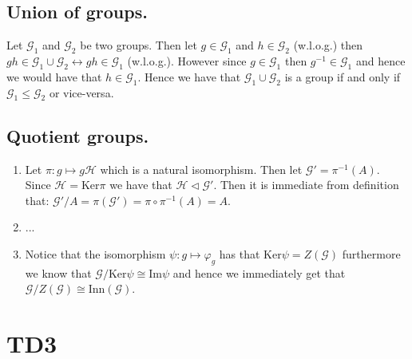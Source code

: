 \documentclass[10pt,a4paper]{book}
\begin{document}
\section{Union of groups.}
Let $\mathcal{G}_1$ and $\mathcal{G}_2$ be two groups. Then let $g \in \mathcal{G}_1$ and $h \in \mathcal{G}_2$ (w.l.o.g.) then $gh \in \mathcal{G}_1 \cup \mathcal{G}_2 \leftrightarrow gh \in \mathcal{G}_1$ (w.l.o.g.). However since $g \in \mathcal{G}_1$ then $g^{-1} \in \mathcal{G}_1$ and hence we would have that $h \in \mathcal{G}_1$. Hence we have that $\mathcal{G}_1 \cup \mathcal{G}_2$ is a group if and only if $\mathcal{G}_1 \leqslant \mathcal{G}_2$ or vice-versa.   

\section{Quotient groups.}
\begin{enumerate}
\item Let $\pi : g \mapsto g \mathcal{H}$ which is a natural isomorphism. Then let $\mathcal{G}' = \pi^{-1}(A)$. Since $\mathcal{H} = \text{Ker}\pi$ we have that $\mathcal{H} \triangleleft \mathcal{G}'$. Then it is immediate from definition that: $\mathcal{G}'/A = \pi(\mathcal{G}') = \pi \circ \pi^{-1} (A) = A$. 
\item ...
\item Notice that the isomorphism $\psi : g \mapsto \varphi_g$ has that $\text{Ker} \psi = Z( \mathcal{G})$ furthermore we know that $\mathcal{G}/\text{Ker} \psi \cong \text{Im} \psi$ and hence we immediately get that $\mathcal{G}/Z(\mathcal{G}) \cong \text{Inn}(\mathcal{G})$. 
\end{enumerate}

\chapter{TD3}
\end{document}
